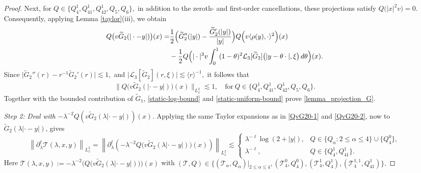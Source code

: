 \documentclass[reqno]{amsart}
\numberwithin{equation}{section}
\begin{document}
\begin{proof}
	
	
	
	Next, for
	$
	Q
	\in
	\{Q_4^1,Q_{41}^1,Q_{42}^1,Q_5,Q_6\},
	$
	in addition to the zeroth- and first-order cancellations, these
	projections satisfy
	$
	Q\bigl(|x|^2v\bigr)=0.
	$ Consequently, 
	applying Lemma \ref{taylor}(iii), 
	we obtain
	\begin{align}
		Q
		\bigl(
		v\widetilde{G}_2(|\cdot-y|)
		\bigr)(x)
=&
		\frac{1}{2}
		\Bigl(
		\widetilde{G}_2''(|y|)
		-
		\frac{\widetilde{G}_2'(|y|)}{|y|}
		\Bigr)
		Q
		\Bigl(
		v\langle\rho(y),\cdot\rangle^2
		\Bigr)(x)
	\nonumber\\
	&	-
		\frac{1}{2}
		Q
		\Bigl(
		|\cdot|^3v
		\int_0^1
		(1-\theta)^2
		\mathcal{L}_3[\widetilde{G}_2]
		\bigl(
		|y-\theta\cdot|,
		\xi
		\bigr)
		\,d\theta
		\Bigr)(x).
		\label{QvG20-2}
	\end{align}
	Since
	$
	\big|
	\widetilde{G}_2''(r)
	-
	r^{-1}\widetilde{G}_2'(r)
	\big|
	\lesssim1,
	$
	and
	$
	\big|
	\mathcal{L}_3[\widetilde{G}_2](r,\xi)
	\big|
	\lesssim
	\langle r\rangle^{-1},
	$
	it follows that
	\begin{equation}\label{static-uniform-bound}
		\Big\|
		Q
		\bigl(
		v\widetilde{G}_2(|\cdot-y|)	\bigr)(x)
		\Big\|_{L_x^2}
		\lesssim1,\quad \text{for}	\ Q
		\in
		\{Q_4^1,Q_{41}^1,Q_{42}^1,Q_5,Q_6\}.
	\end{equation}
	Together with the bounded contribution of $\widetilde{G}_1$,
	\eqref{static-log-bound} and \eqref{static-uniform-bound} prove
	\eqref{lemma_projection_G}.
	
	\medskip
	
	\textit{Step 2: Deal with $-\lambda^{-2}Q(v	\widetilde{G}_2(\lambda|\cdot-y|))(x)$.}
	Applying the same Taylor expansions as in
	\eqref{QvG20-1} and \eqref{QvG20-2}, now to 
	$\widetilde{G}_2(\lambda|\cdot-y|)$, gives
	\begin{equation*}
	\left\|
		\partial_\lambda^\ell\mathcal{T}(\lambda,x,y)
		\right\|_{L_x^2}=	\left\|
		\partial_\lambda^\ell\left(
		-\lambda^{-2}
	Q
	\bigl(
	v\widetilde{G}_2(\lambda|\cdot-y|)
	\bigr)(x)\right)
		\right\|_{L_x^2}
		\lesssim
		\begin{cases}
			\lambda^{-\ell}\log(2+|y|),
			&
			Q\in
			\{Q_\alpha:2\leq\alpha\leq4\}
			\cup
			\{Q_4^0\},
			\\
			\lambda^{-\ell},
			&
			Q\in
			\{Q_4^1,Q_{41}^1\}.
		\end{cases}
	\end{equation*}
	Here $\mathcal{T}(\lambda, x,y ):=-\lambda^{-2}\bigl(Q \bigl(v\widetilde{G}_2(\lambda|\cdot-y|)\bigr)\bigr)(x)$ with $(\mathcal{T}, Q)\in\{ (\mathcal{T}_\alpha, Q_\alpha)|_{2\le\alpha\le4}, (\mathcal{T}_4^0, Q_4^0), (\mathcal{T}_4^1, Q_4^1), (\mathcal{T}_4^{1,1}, Q_{41}^1) \}.$
	

\end{proof}
\end{document}
